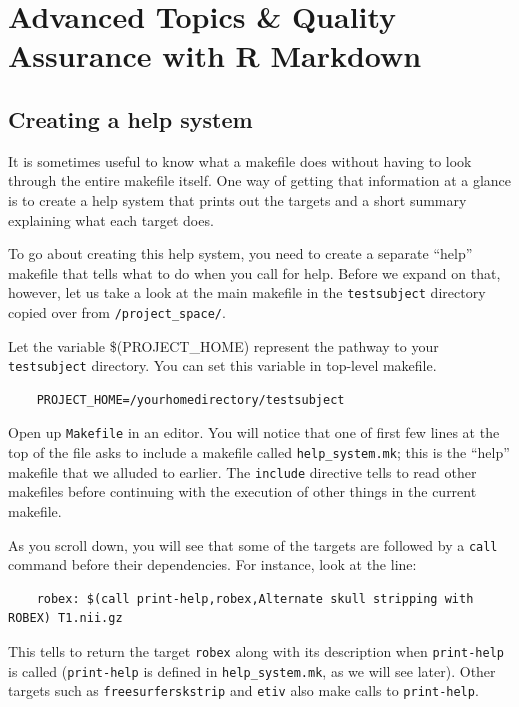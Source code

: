 \chapter{Advanced Topics \& Quality Assurance with R Markdown} 
\label{sec:practicum4}

\section{Creating a \maken{} help system}
It is sometimes useful to know what a makefile does without having to look through the entire makefile itself. One way of getting that information at a glance is to create a \maken{} help system that prints out the targets and a short summary explaining what each target does. 

To go about creating this help system, you need to create a separate ``help'' makefile that tells \maken{} what to do when you call for help. Before we expand on that, however, let us take a look at the main makefile in the \texttt{testsubject} directory copied over from \texttt{/project_space/}.

Let the variable \$(PROJECT_HOME) represent the pathway to your \texttt{testsubject} directory. You can set this variable in top-level makefile.
\begin{lstlisting}
	PROJECT_HOME=/yourhomedirectory/testsubject
\end{lstlisting}

Open up \texttt{Makefile} in an editor. You will notice that one of first few lines at the top of the file asks \maken{} to include a makefile called \texttt{help_system.mk}; this is the ``help'' makefile that we alluded to earlier. The \texttt{include} directive tells \maken{} to read other makefiles before continuing with the execution of other things in the current makefile.    

As you scroll down, you will see that some of the targets are followed by a \texttt{call} command before their dependencies. For instance, look at the line:
\begin{lstlisting}
	robex: $(call print-help,robex,Alternate skull stripping with ROBEX) T1.nii.gz
\end{lstlisting}

This tells \maken{} to return the target \texttt{robex} along with its description when \texttt{print-help} is called (\texttt{print-help} is defined in \texttt{help_system.mk}, as we will see later). Other targets such as \texttt{freesurferskstrip} and \texttt{etiv} also make calls to \texttt{print-help}.

